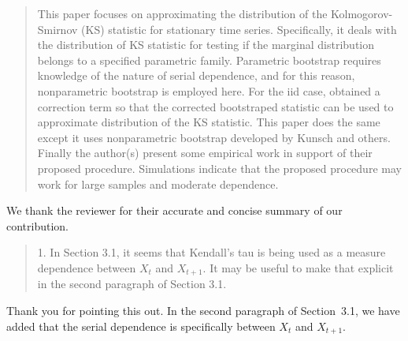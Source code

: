 \documentclass[12pt]{article}
\newenvironment{comment}%
{\begin{quotation}\noindent\small\it\color{darkblue}\ignorespaces%
}{\end{quotation}}
\begin{document}
\begin{comment}
This paper focuses on approximating the distribution of the Kolmogorov-
Smirnov (KS) statistic for stationary time series. Specifically, it deals with the
distribution of KS statistic for testing if the marginal distribution belongs to
a specified parametric family. Parametric bootstrap requires knowledge of the
nature of serial dependence, and for this reason, nonparametric bootstrap is 
employed here. For the iid case, \citet{babu2004goodness} obtained a correction 
term so that the corrected bootstraped statistic can be used to approximate 
distribution of the KS statistic. This paper does the same except it uses 
nonparametric bootstrap developed by Kunsch and others. Finally the author(s) 
present some empirical work in support of their proposed procedure. Simulations 
indicate that the proposed procedure may work for large samples and
moderate dependence.
\end{comment}

We thank the reviewer for their accurate and concise summary of our
contribution.

\begin{comment}
1. In Section 3.1, it seems that Kendall's tau is being used as a measure
dependence between $X_t$ and $X_{t+1}$. It may be useful to make that explicit 
in the second paragraph of Section 3.1.
\end{comment}

Thank you for pointing this out. In the second paragraph of
Section~3.1, we have added that the serial dependence is specifically
between $X_t$ and $X_{t+1}$.
\end{document}
